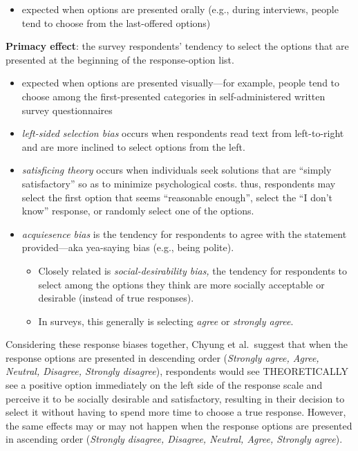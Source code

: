 \documentclass[
  english,
]{book}
\providecommand{\tightlist}{%
  \setlength{\itemsep}{0pt}\setlength{\parskip}{0pt}}
\begin{document}
\begin{itemize}
\tightlist
\item
  expected when options are presented orally (e.g., during interviews, people tend to choose from the last-offered options)
\end{itemize}

\textbf{Primacy effect}: the survey respondents' tendency to select the options that are presented at the beginning of the
response-option list.

\begin{itemize}
\tightlist
\item
  expected when options are presented visually---for example, people tend to choose among the first-presented categories in self-administered written survey questionnaires
\item
  \emph{left-sided selection bias} occurs when respondents read text from left-to-right and are more inclined to select options from the left.
\item
  \emph{satisficing theory} occurs when individuals seek solutions that are ``simply satisfactory'' so as to minimize psychological costs. thus, respondents may select the first option that seems ``reasonable enough'', select the ``I don't know'' response, or randomly select one of the options.
\item
  \emph{acquiesence bias} is the tendency for respondents to agree with the statement provided---aka yea-saying bias (e.g., being polite).

  \begin{itemize}
  \tightlist
  \item
    Closely related is \emph{social-desirability bias,} the tendency for respondents to select among the options they think are more socially acceptable or desirable (instead of true responses).
  \item
    In surveys, this generally is selecting \emph{agree} or \emph{strongly agree}.
  \end{itemize}
\end{itemize}

Considering these response biases together, Chyung et al.~suggest that when the response options are presented in descending order (\emph{Strongly agree, Agree, Neutral, Disagree, Strongly disagree}), respondents would see THEORETICALLY see a positive option immediately on the left side of the response scale and perceive it to be socially desirable and satisfactory, resulting in their decision to select it without having to spend more time to choose a true response. However, the same effects may or may not happen when the response options are presented in ascending order (\emph{Strongly disagree, Disagree, Neutral, Agree, Strongly agree}).
\end{document}
